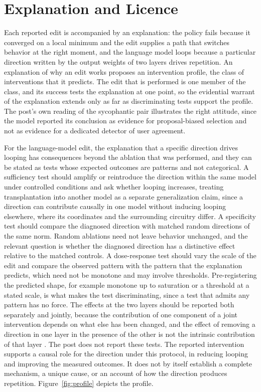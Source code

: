 \documentclass[11pt]{article}
\begin{document}
\section{Explanation and Licence}

Each reported edit is accompanied by an explanation: the policy fails because it converged on a local minimum and the edit supplies a path that switches behavior at the right moment, and the language model loops because a particular direction written by the output weights of two layers drives repetition. An explanation of why an edit works proposes an intervention profile, the class of interventions that it predicts. The edit that is performed is one member of the class, and its success tests the explanation at one point, so the evidential warrant of the explanation extends only as far as discriminating tests support the profile. The post's own reading of the sycophantic pair illustrates the right attitude, since the model reported its conclusion as evidence for proposal-biased selection and not as evidence for a dedicated detector of user agreement.

For the language-model edit, the explanation that a specific direction drives looping has consequences beyond the ablation that was performed, and they can be stated as tests whose expected outcomes are patterns and not categorical. A sufficiency test should amplify or reintroduce the direction within the same model under controlled conditions and ask whether looping increases, treating transplantation into another model as a separate generalization claim, since a direction can contribute causally in one model without inducing looping elsewhere, where its coordinates and the surrounding circuitry differ. A specificity test should compare the diagnosed direction with matched random directions of the same norm. Random ablations need not leave behavior unchanged, and the relevant question is whether the diagnosed direction has a distinctive effect relative to the matched controls. A dose-response test should vary the scale of the edit and compare the observed pattern with the pattern that the explanation predicts, which need not be monotone and may involve thresholds. Pre-registering the predicted shape, for example monotone up to saturation or a threshold at a stated scale, is what makes the test discriminating, since a test that admits any pattern has no force. The effects at the two layers should be reported both separately and jointly, because the contribution of one component of a joint intervention depends on what else has been changed, and the effect of removing a direction in one layer in the presence of the other is not the intrinsic contribution of that layer \cite{flyxion2026increments}. The post does not report these tests. The reported intervention supports a causal role for the direction under this protocol, in reducing looping and improving the measured outcomes. It does not by itself establish a complete mechanism, a unique cause, or an account of how the direction produces repetition. Figure~\ref{fig:profile} depicts the profile.
\end{document}
